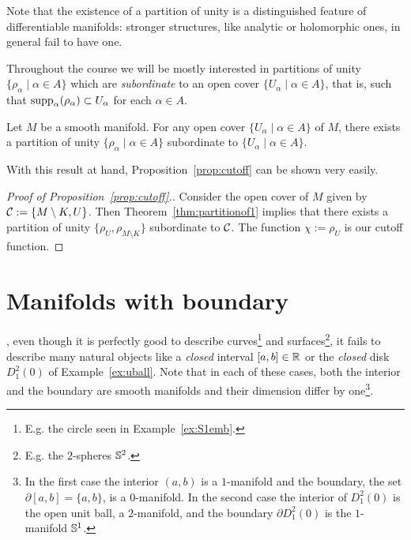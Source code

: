 \begin{remark}
	Note that the existence of a partition of unity is a distinguished feature of differentiable manifolds: stronger structures, like analytic or holomorphic ones, in general fail to have one.
\end{remark}

Throughout the course we will be mostly interested in partitions of unity $\{\rho_\alpha \mid \alpha\in A\}$ which are \emph{subordinate} to an open cover $\{U_\alpha\mid\alpha\in A\}$, that is, such that $\operatorname{supp}_\alpha(\rho_\alpha) \subset U_\alpha$ for each $\alpha\in A$.

\begin{theorem}\label{thm:partitionof1}
	Let $M$ be a smooth manifold. For any open cover $\{U_\alpha\mid\alpha\in A\}$ of $M$, there exists a partition of unity $\{\rho_\alpha \mid \alpha\in A\}$ subordinate to $\{U_\alpha\mid\alpha\in A\}$.
\end{theorem}

With this result at hand, Proposition~\ref{prop:cutoff} can be shown very easily.

\begin{proof}[Proof of Proposition~\ref{prop:cutoff}.]
	Consider the open cover of $M$ given by $\mathcal{C}:=\{M\setminus K, U\}$.
	Then Theorem~\ref{thm:partitionof1} implies that there exists a partition of unity $\{\rho_U, \rho_{M\setminus K}\}$ subordinate to $\mathcal{C}$. The function $\chi := \rho_U$ is our cutoff function.
\end{proof}

\section{Manifolds with boundary}\label{sec:mbnd}

, even though it is perfectly good to describe curves\footnote{E.g. the circle seen in Example~\ref{ex:S1emb}.} and surfaces\footnote{E.g. the $2$-spheres $\mathbb{S}^2$.}, it fails to describe many natural objects like a \emph{closed} interval $[a,b]\in\mathbb{R}$ or the \emph{closed} disk $D_1^2(0)$ of Example~\ref{ex:uball}.
Note that in each of these cases, both the interior and the boundary are smooth manifolds and their dimension differ by one\footnote{In the first case the interior $(a,b)$ is a $1$-manifold and the boundary, the set $\partial[a,b] = \{a,b\}$, is a $0$-manifold. In the second case the interior of $D_1^2(0)$ is the open unit ball, a $2$-manifold, and the boundary $\partial D_1^2(0)$ is the $1$-manifold $\mathbb{S}^1$.}.

